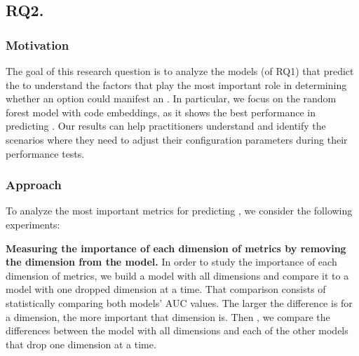 
\subsection*{\textbf{RQ2. \RQIII}}
\label{sec:rq3}


\subsubsection*{Motivation}
The goal of this research question is to analyze the models (of RQ1) that predict the \inconsistent to understand the factors that play the most important role in determining whether an option could manifest an \inconsistence%
. In particular, we focus on the random forest model with code embeddings, as it shows the best performance in predicting \inconsistent. 
Our results can help practitioners understand and identify the scenarios where they need to adjust their configuration parameters during their performance tests.

\subsubsection*{Approach}

To analyze the most important metrics for predicting \inconsistent, we consider the following experiments:

\noindent\textbf{Measuring the importance of each dimension of metrics by removing the dimension from the model.} 
In order to study the importance of each dimension of metrics, we build a model with all dimensions and compare it to a model with one dropped dimension at a time. That comparison consists of statistically comparing both models' AUC values. The larger the difference is for a dimension, the more important that dimension is. Then , we compare the differences between the model with all dimensions and each of the other models that drop one dimension at a time. 


